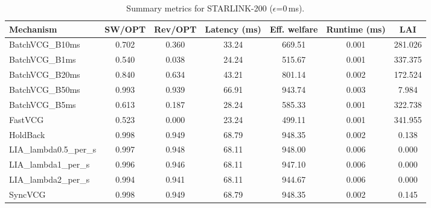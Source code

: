 \begin{table}[t]
\centering
\small
\setlength{\tabcolsep}{6pt}
\begin{tabular}{lcccccc}
\toprule
Mechanism & SW/OPT & Rev/OPT & Latency (ms) & Eff. welfare & Runtime (ms) & LAI \\
\midrule
BatchVCG_B10ms & 0.702 & 0.360 & 33.24 & 669.51 & 0.001 & 281.026 \\
BatchVCG_B1ms & 0.540 & 0.038 & 24.24 & 515.67 & 0.001 & 337.375 \\
BatchVCG_B20ms & 0.840 & 0.634 & 43.21 & 801.14 & 0.002 & 172.524 \\
BatchVCG_B50ms & 0.993 & 0.939 & 66.91 & 943.74 & 0.003 & 7.984 \\
BatchVCG_B5ms & 0.613 & 0.187 & 28.24 & 585.33 & 0.001 & 322.738 \\
FastVCG & 0.523 & 0.000 & 23.24 & 499.11 & 0.001 & 341.955 \\
HoldBack & 0.998 & 0.949 & 68.79 & 948.35 & 0.002 & 0.138 \\
LIA_lambda0.5_per_s & 0.997 & 0.948 & 68.11 & 948.00 & 0.006 & 0.000 \\
LIA_lambda1_per_s & 0.996 & 0.946 & 68.11 & 947.10 & 0.006 & 0.000 \\
LIA_lambda2_per_s & 0.994 & 0.941 & 68.11 & 944.67 & 0.006 & 0.000 \\
SyncVCG & 0.998 & 0.949 & 68.79 & 948.35 & 0.002 & 0.145 \\
\bottomrule
\end{tabular}
\caption{Summary metrics for STARLINK-200 ($\epsilon$=0\,ms).}
\label{tab:starlink200_eps0p0}
\end{table}
